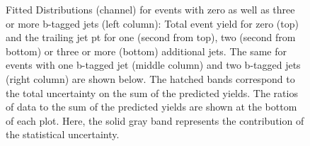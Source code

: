 \begin{figure}[htbp!]
\begin{center}
\caption{Fitted Distributions (\emu channel) for events with zero as well as three or
  more b-tagged jets (left column): Total event yield for zero (top) and the trailing jet pt for one (second from top),
  two (second from bottom) or three or more (bottom) additional jets. The same for events with one
  b-tagged jet (middle column) and two b-tagged jets (right column) are
  shown below.   
  The hatched bands correspond to the total uncertainty on the sum of
  the predicted yields. The ratios of data to the sum of the
  predicted yields are shown at the bottom of each plot. Here, the solid
  gray band represents the contribution of the statistical uncertainty.   
       \label{fig:lh_emu_postfitdistr8}}
  \end{center}
\end{figure}

\begin{figure}[htbp!]
  \begin{center}

    \\



\end{center}
\end{figure}
